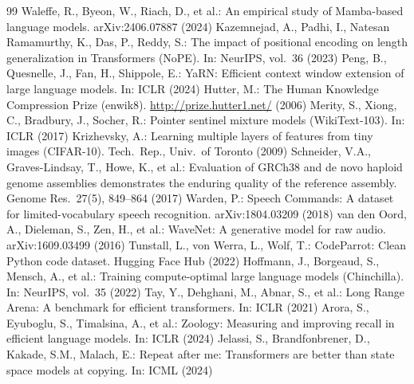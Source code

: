 \documentclass[10pt,a4paper]{article}
\begin{document}
\begin{thebibliography}{99}
 Waleffe, R., Byeon, W., Riach, D., et al.: An empirical study of Mamba-based language models. arXiv:2406.07887 (2024)
 Kazemnejad, A., Padhi, I., Natesan Ramamurthy, K., Das, P., Reddy, S.: The impact of positional encoding on length generalization in Transformers (NoPE). In: NeurIPS, vol.\ 36 (2023)
 Peng, B., Quesnelle, J., Fan, H., Shippole, E.: YaRN: Efficient context window extension of large language models. In: ICLR (2024)
 Hutter, M.: The Human Knowledge Compression Prize (enwik8). \url{http://prize.hutter1.net/} (2006)
 Merity, S., Xiong, C., Bradbury, J., Socher, R.: Pointer sentinel mixture models (WikiText-103). In: ICLR (2017)
 Krizhevsky, A.: Learning multiple layers of features from tiny images (CIFAR-10). Tech.\ Rep., Univ.\ of Toronto (2009)
 Schneider, V.A., Graves-Lindsay, T., Howe, K., et al.: Evaluation of GRCh38 and de novo haploid genome assemblies demonstrates the enduring quality of the reference assembly. Genome Res.\ 27(5), 849--864 (2017)
 Warden, P.: Speech Commands: A dataset for limited-vocabulary speech recognition. arXiv:1804.03209 (2018)
 van den Oord, A., Dieleman, S., Zen, H., et al.: WaveNet: A generative model for raw audio. arXiv:1609.03499 (2016)
 Tunstall, L., von Werra, L., Wolf, T.: CodeParrot: Clean Python code dataset. Hugging Face Hub (2022)
 Hoffmann, J., Borgeaud, S., Mensch, A., et al.: Training compute-optimal large language models (Chinchilla). In: NeurIPS, vol.\ 35 (2022)
 Tay, Y., Dehghani, M., Abnar, S., et al.: Long Range Arena: A benchmark for efficient transformers. In: ICLR (2021)
 Arora, S., Eyuboglu, S., Timalsina, A., et al.: Zoology: Measuring and improving recall in efficient language models. In: ICLR (2024)
 Jelassi, S., Brandfonbrener, D., Kakade, S.M., Malach, E.: Repeat after me: Transformers are better than state space models at copying. In: ICML (2024)
\end{thebibliography}
\end{document}
